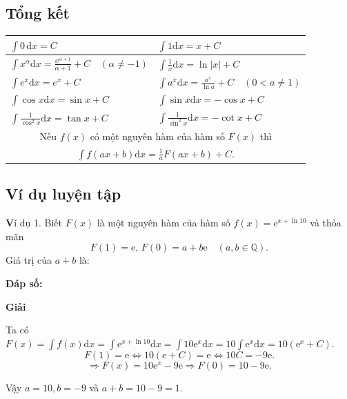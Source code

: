\documentclass[12pt,a4paper,oneside]{book}
\theoremstyle{theorem}
\theoremstyle{definition}
\begin{document}
\subsection{Tổng kết}
\begin{center}
\renewcommand{\arraystretch}{2}
\begin{tabular}{|l|l|}
\hline
$\displaystyle\int 0\,\mathrm{d}x = C$ & $\displaystyle\int 1\mathrm{d}x = x + C$ \\ \hline
$\displaystyle\int x^{\alpha}\mathrm{d}x = \frac{x^{\alpha+1}}{\alpha + 1} + C \quad (\alpha \neq -1)$ & $\displaystyle\int \frac{1}{x}\mathrm{d}x = \ln|x| + C$ \\ \hline
$\displaystyle\int e^x \mathrm{d}x = e^x + C$ & $\displaystyle\int a^x \mathrm{d}x = \frac{a^x}{\ln a} + C \quad (0 < a \neq 1)$ \\ \hline
$\displaystyle\int \cos x \mathrm{d}x = \sin x + C$ & $\displaystyle\int \sin x \mathrm{d}x = -\cos x + C$ \\ \hline
$\displaystyle\int \frac{1}{\cos^2 x}\mathrm{d}x = \tan x + C$ & $\displaystyle\int \frac{1}{\sin^2 x}\mathrm{d}x = -\cot x + C$ \\ \hline
\multicolumn{2}{|c|}{Nếu $f(x)$ có một nguyên hàm của hàm số $F(x)$ thì} \\
\multicolumn{2}{|c|}{$\displaystyle\int f(ax + b)\mathrm{d}x = \frac{1}{a}F(ax + b) + C.$} \\ \hline
\end{tabular}
\end{center}
\subsection{Ví dụ luyện tập}
\noindent \textbf Ví dụ 1. Biết $F(x)$ là một nguyên hàm của hàm số $f(x) = \mathrm{e}^{x + \ln 10}$ và thỏa mãn
\[
F(1) = \mathrm{e},\, F(0) = a + b\mathrm{e} \quad (a, b \in \mathbb{Q}).
\]
Giá trị của $a + b$ là:

\noindent \textbf{Đáp số:} \makebox[4cm]\dotfill
\begin{center}
\textbf{Giải}
\end{center}
\noindent Ta có $F(x) = \int f(x)\mathrm{d}x = \int \mathrm{e}^{x + \ln 10}\mathrm{d}x = \int 10\mathrm{e}^x\mathrm{d}x = 10\int \mathrm{e}^x\mathrm{d}x = 10(\mathrm{e}^x + C)$.
\[
F(1) = \mathrm{e} \Leftrightarrow 10(\mathrm{e} + C) = \mathrm{e} \Leftrightarrow 10C = -9\mathrm{e}.
\]
\[
\Rightarrow F(x) = 10\mathrm{e}^x - 9\mathrm{e} \Rightarrow F(0) = 10 - 9\mathrm{e}.
\]

\noindent Vậy $a = 10, b = -9$ và $a + b = 10 - 9 = 1$.
\end{document}
